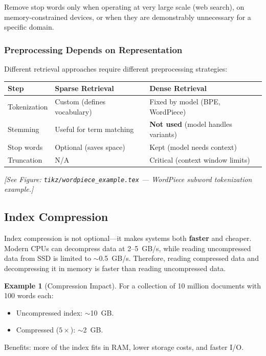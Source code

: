 \documentclass[aspectratio=169]{beamer} \usetheme{TUDelft} %
\theoremstyle{definition}
\newtheorem{example}{Example}[section]
\theoremstyle{plain}
\begin{document}
Remove stop words only when operating at very large scale (web search), on memory-constrained devices, or when they are demonstrably unnecessary for a specific domain.

\subsubsection{Preprocessing Depends on Representation}

Different retrieval approaches require different preprocessing strategies:

\begin{center}
\begin{tabular}{lll}
\toprule
\textbf{Step} & \textbf{Sparse Retrieval} & \textbf{Dense Retrieval} \\
\midrule
Tokenization & Custom (defines vocabulary) & Fixed by model (BPE, WordPiece) \\
Stemming & Useful for term matching & \textbf{Not used} (model handles variants) \\
Stop words & Optional (saves space) & Kept (model needs context) \\
Truncation & N/A & Critical (context window limits) \\
\bottomrule
\end{tabular}
\end{center}

\begin{center}
\textit{[See Figure: \texttt{tikz/wordpiece\_example.tex} --- WordPiece subword tokenization example.]}
\end{center}


\subsection{Index Compression}
\label{sec:compression}

Index compression is not optional---it makes systems both \textbf{faster} and cheaper. Modern CPUs can decompress data at 2--5~GB/s, while reading uncompressed data from SSD is limited to $\sim$0.5~GB/s. Therefore, reading compressed data and decompressing it in memory is faster than reading uncompressed data.

\begin{example}[Compression Impact]
For a collection of 10 million documents with 100 words each:
\begin{itemize}
    \item Uncompressed index: $\sim$10~GB.
    \item Compressed ($5\times$): $\sim$2~GB.
\end{itemize}
Benefits: more of the index fits in RAM, lower storage costs, and faster I/O.
\end{example}
\end{document}
